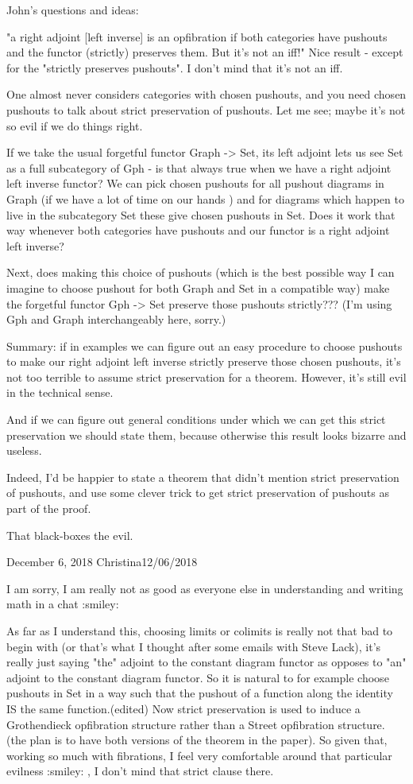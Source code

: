 \documentclass{amsart}
\begin{document}
{\chris John's questions and ideas:}

"a right adjoint [left inverse] is an opfibration if both categories have pushouts and the functor (strictly) preserves them. But it's not an iff!"
Nice result - except for the "strictly preserves pushouts".   I don't mind that it's not an iff.

One almost never considers categories with chosen pushouts, and you need chosen pushouts to talk about strict preservation of pushouts.
Let me see; maybe it's not so evil if we do things right.

If we take the usual forgetful functor Graph -> Set, its left adjoint lets us see Set as a full subcategory of Gph - is that always true when we have a right adjoint left inverse functor?
We can pick chosen pushouts for all pushout diagrams in Graph (if we have a lot of time on our hands ) and for diagrams which happen to live in the subcategory Set these give chosen pushouts in Set.
Does it work that way whenever both categories have pushouts and our functor is a right adjoint left inverse?

Next, does making this choice of pushouts (which is the best possible way I can imagine to choose pushout for both Graph and Set in a compatible way) make the forgetful functor Gph -> Set preserve those pushouts strictly???
(I'm using Gph and Graph interchangeably here, sorry.)

Summary: if in examples we can figure out an easy procedure to choose pushouts to make our right adjoint left inverse strictly preserve those chosen pushouts, it's not too terrible to assume strict preservation for a theorem.
However, it's still evil in the technical sense.

And if we can figure out general conditions under which we can get this strict preservation we should state them, because otherwise this result looks bizarre and useless.

Indeed, I'd be happier to state a theorem that didn't mention strict preservation of pushouts, and use some clever trick to get strict preservation of pushouts as part of the proof.

That black-boxes the evil.

December 6, 2018
Christina12/06/2018

I am sorry, I am really not as good as everyone else in understanding and writing math in a chat :smiley: 

As far as I understand this, choosing limits or colimits is really not that bad to begin with (or that's what I thought after some emails with Steve Lack), it's really just saying "the" adjoint to the constant diagram functor as opposes to "an" adjoint to the constant diagram functor. So it is natural to for example choose pushouts in Set in a way such that the pushout of a function along the identity IS the same function.(edited)
Now strict preservation is used to induce a Grothendieck opfibration structure rather than a Street opfibration structure. (the plan is to have both versions of the theorem in the paper). So given that, working so much with fibrations, I feel very comfortable around that particular evilness :smiley: , I don't mind that strict clause there.
\end{document}
